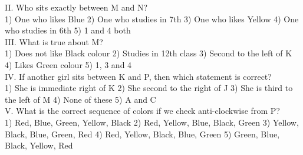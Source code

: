 \documentclass[
]{article}
\begin{document}
II. Who sits exactly between M and N?\\
1) One who likes Blue \hspace{2mm}2) One who studies in 7th
\hspace{2mm}3) One who likes Yellow \hspace{2mm}4) One who studies in 6th
\hspace{2mm}5) 1 and 4 both\\

III. What is true about M?\\
1) Does not like Black colour \hspace{2mm}2) Studies in 12th class
\hspace{2mm}3) Second to the left of K \hspace{2mm}4) Likes Green colour
\hspace{2mm}5) 1, 3 and 4\\

IV. If another girl sits between K and P, then which statement is correct?\\
1) She is immediate right of K \hspace{2mm}2) She second to the right of J
\hspace{2mm}3) She is third to the left of M \hspace{2mm}4) None of these
5) A and C\\

V. What is the correct sequence of colors if we check anti-clockwise from P?\\
1) Red, Blue, Green, Yellow, Black \hspace{2mm}2) Red, Yellow, Blue, Black, Green
\hspace{2mm}3) Yellow, Black, Blue, Green, Red \hspace{2mm}4) Red, Yellow, Black, Blue, Green
\hspace{2mm}5) Green, Blue, Black, Yellow, Red\\
\end{document}
